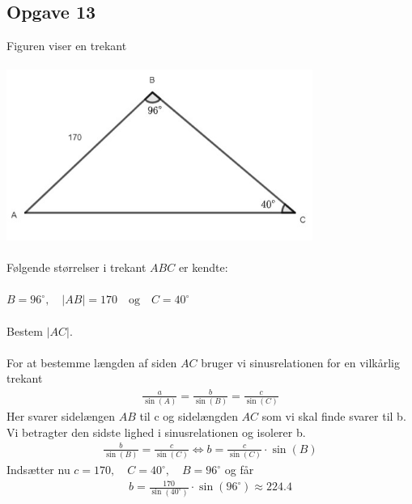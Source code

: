 \subsection{Opgave 13}

Figuren viser en trekant\\\\
\includegraphics[width=10cm]{Opgave_11-20/Opgave_13/Opgave_13.jpg}\\\\
Følgende størrelser i trekant $ABC$ er kendte:\\\\
$B = 96^{\circ},\quad |AB| = 170\quad \text{og}\quad C = 40^{\circ}$\\\\

Bestem $|AC|$.\\\\

\ans
For at bestemme længden af siden $AC$ bruger vi sinusrelationen for en vilkårlig trekant
\begin{align*}
    \frac{a}{\sin(A)} = \frac{b}{\sin(B)} = \frac{c}{\sin(C)}
\end{align*}
Her svarer sidelængen $AB$ til c og sidelængden $AC$ som vi skal finde svarer til b. Vi betragter den sidste lighed i sinusrelationen og isolerer b.
\begin{align*}
    \frac{b}{\sin(B)} =\frac{c}{\sin(C)} \Longleftrightarrow b = \frac{c}{\sin(C)}\cdot \sin(B)
\end{align*}
Indsætter nu $c = 170,\quad C = 40^{\circ},\quad B = 96^{\circ}$ og får 
\begin{align*}
    b = \frac{170}{\sin(40^{\circ})}\cdot \sin(96^{\circ})\approx 224.4
\end{align*}